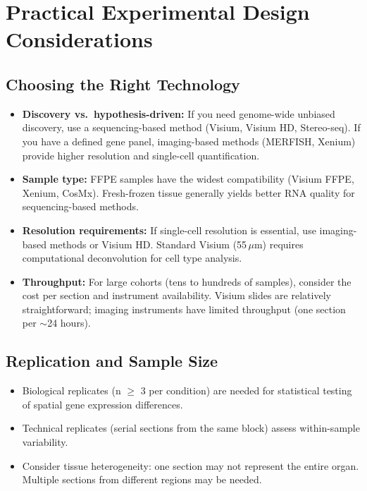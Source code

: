 \section{Practical Experimental Design Considerations}
\label{sec:spatial:design}

\subsection{Choosing the Right Technology}

\begin{itemize}[nosep]
  \item \textbf{Discovery vs.\ hypothesis-driven:} If you need genome-wide
    unbiased discovery, use a sequencing-based method (Visium, Visium HD,
    Stereo-seq). If you have a defined gene panel, imaging-based methods
    (MERFISH, Xenium) provide higher resolution and single-cell quantification.
  \item \textbf{Sample type:} FFPE samples have the widest compatibility
    (Visium FFPE, Xenium, CosMx). Fresh-frozen tissue generally yields better
    RNA quality for sequencing-based methods.
  \item \textbf{Resolution requirements:} If single-cell resolution is essential,
    use imaging-based methods or Visium HD. Standard Visium (55\,$\mu$m)
    requires computational deconvolution for cell type analysis.
  \item \textbf{Throughput:} For large cohorts (tens to hundreds of samples),
    consider the cost per section and instrument availability. Visium slides
    are relatively straightforward; imaging instruments have limited throughput
    (one section per $\sim$24 hours).
\end{itemize}

\subsection{Replication and Sample Size}

\begin{itemize}[nosep]
  \item Biological replicates (n $\geq$ 3 per condition) are needed for
    statistical testing of spatial gene expression differences.
  \item Technical replicates (serial sections from the same block) assess
    within-sample variability.
  \item Consider tissue heterogeneity: one section may not represent the entire
    organ. Multiple sections from different regions may be needed.
\end{itemize}

